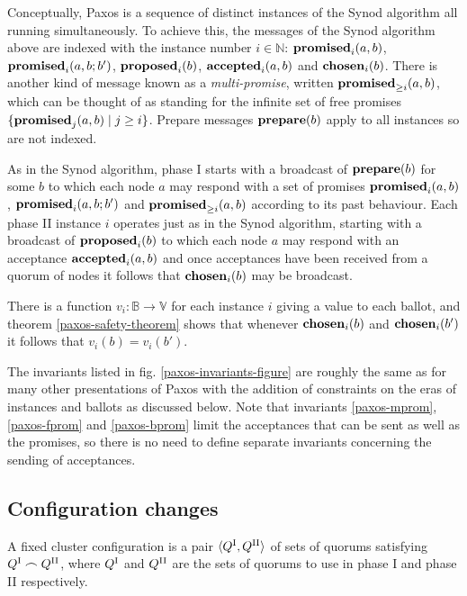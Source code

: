 \documentclass[journal]{IEEEtran}
\begin{document}
Conceptually, Paxos is a sequence of distinct instances of the Synod algorithm
all running simultaneously. To achieve this, the messages of the Synod
algorithm above are indexed with the instance number $i \in \mathbb N$:
$\mathbf{promised}_{i}(a,b)$, $\mathbf{promised}_{i}(a,b;b')$, $\mathbf{proposed}_{i}(b)$, $\mathbf{accepted}_{i}(a,b)$ and
$\mathbf{chosen}_{i}(b)$.  There is another kind of message known as a
\textit{multi-promise}, written $\mathbf{promised}_{\ge i}(a,b)$, which can be thought of as
standing for the infinite set of free promises ${\{ \mathbf{promised}_{j}(a,b) \mid j \ge
i \}}$. Prepare messages $\mathbf{prepare}(b)$ apply to all instances so are not indexed.

As in the Synod algorithm, phase I starts with a broadcast of $\mathbf{prepare}(b)$ for
some $b$ to which each node $a$ may respond with a set of promises
$\mathbf{promised}_{i}(a,b)$, $\mathbf{promised}_{i}(a,b;b')$ and $\mathbf{promised}_{\ge i}(a,b)$ according to its
past behaviour. Each phase II instance $i$ operates just as in the Synod
algorithm, starting with a broadcast of $\mathbf{proposed}_{i}(b)$ to which each node $a$
may respond with an acceptance $\mathbf{accepted}_{i}(a,b)$ and once acceptances have been
received from a quorum of nodes it follows that $\mathbf{chosen}_{i}(b)$ may be
broadcast.

There is a function $v_i : \mathbb B \to \mathbb V$ for each instance $i$
giving a value to each ballot, and theorem \ref{paxos-safety-theorem} shows
that whenever $\mathbf{chosen}_{i}(b)$ and $\mathbf{chosen}_{i}(b')$ it follows that $v_i(b) =
v_i(b')$.

The invariants listed in fig. \ref{paxos-invariants-figure} are roughly the
same as for many other presentations of Paxos with the addition of constraints
on the eras of instances and ballots as discussed below. Note that invariants
\ref{paxos-mprom}, \ref{paxos-fprom} and \ref{paxos-bprom} limit the
acceptances that can be sent as well as the promises, so there is no need to
define separate invariants concerning the sending of acceptances.

\subsection{Configuration changes}\label{configuration-changes}

A fixed cluster configuration is a pair $\langle {Q}^\textrm{I}_{}, {Q}^\textrm{II}_{} \rangle$ of sets
of quorums satisfying ${Q}^\textrm{I}_{} \frown {Q}^\textrm{II}_{}$, where ${Q}^\textrm{I}_{}$ and ${Q}^\textrm{II}_{}$ are the
sets of quorums to use in phase I and phase II respectively.
\end{document}
